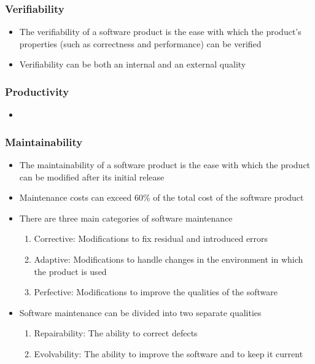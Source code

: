 \documentclass[t,12pt,numbers,fleqn]{beamer}
\begin{document}

\begin{frame}
\frametitle{Verifiability}

\begin{itemize}
\item The verifiability of a software product is the ease with which the
  product's properties (such as correctness and performance) can be verified
\item Verifiability can be both an internal and an external quality
\end{itemize}

\end{frame}


\begin{frame}
\frametitle{Productivity}

\begin{itemize}
\item 
\end{itemize}

\end{frame}


\begin{frame}
\frametitle{Maintainability}

\begin{itemize}
\item The maintainability of a software product is the ease with which the
  product can be modified after its initial release
\item Maintenance costs can exceed 60\% of the total cost of the software product
\item There are three main categories of software maintenance
\begin{enumerate}
\item Corrective: Modifications to fix residual and introduced errors
\item Adaptive: Modifications to handle changes in the environment in which the product is used
\item Perfective: Modifications to improve the qualities of the software
\end{enumerate}
\item Software maintenance can be divided into two separate qualities
\begin{enumerate}
\item Repairability: The ability to correct defects
\item Evolvability: The ability to improve the software and to keep it current
\end{enumerate}
\end{itemize}

\end{frame}
\end{document}
